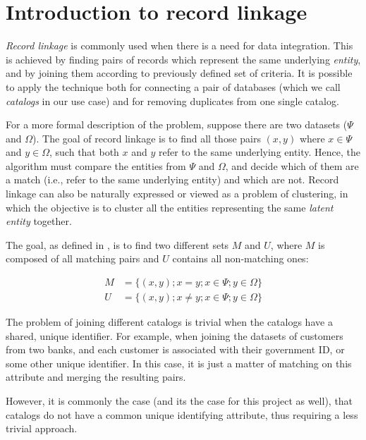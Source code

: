 \documentclass[epsfig,a4paper,11pt,titlepage,twoside,openany]{book}
\begin{document}
\section{Introduction to record linkage}
\label{sec:rl-intro}

\textit{Record linkage} is commonly used when there is a need for data integration. This is achieved by finding pairs of records which represent the same underlying \textit{entity}, and by joining them according to previously defined set of criteria. It is possible to apply the technique both for connecting a pair of databases (which we call \textit{catalogs} in our use case) and for removing duplicates from one single catalog.

  

For a more formal description of the problem, suppose there are two datasets ($\Psi$ and $\Omega$). The goal of record linkage is to find all those pairs $(x, y)$ where $x \in \Psi$ and $y \in \Omega$, such that both $x$ and $y$ refer to the same underlying entity. Hence, the algorithm must compare the entities from $\Psi$ and $\Omega$, and decide which of them are a match (i.e., refer to the same underlying entity) and which are not. 
Record linkage can also be naturally expressed or viewed as a problem of clustering, in which the objective is to cluster all the entities representing the same \textit{latent entity} together.

The goal, as defined in \cite{fellegi69_theor_recor_linkag}, is to find two different sets $M$ and $U$, where $M$ is composed of all matching pairs and $U$ contains all non-matching ones:

\begin{align*}
  M &= \{(x, y); x = y; x \in \Psi; y \in \Omega\} \\
  U &= \{(x, y); x \neq y; x \in \Psi; y \in \Omega\}
\end{align*}

The problem of joining different catalogs is trivial when the catalogs have a
shared, unique identifier. For example, when joining the datasets of
customers from two banks, and each customer is associated with their government
ID, or some other unique identifier. In this case, it is just a matter of
matching on this attribute and merging the resulting pairs.

However, it is commonly the case (and its the case for this project as well), that
catalogs do not have a common unique identifying attribute, thus requiring a less trivial approach.
\end{document}
